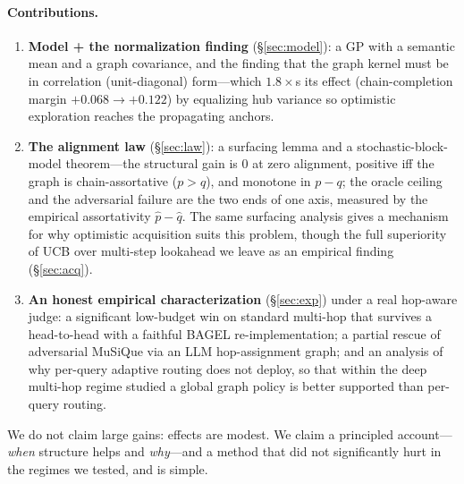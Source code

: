 \documentclass[11pt]{article}
\theoremstyle{plain}\newtheorem{theorem}{Theorem}\newtheorem{lemma}{Lemma}\newtheorem{proposition}{Proposition}
\theoremstyle{definition}\newtheorem{assumption}{Assumption}\newtheorem{remark}{Remark}
\begin{document}
\paragraph{Contributions.}
\begin{enumerate}[leftmargin=*,itemsep=1pt,topsep=2pt]
\item \textbf{Model + the normalization finding} (\S\ref{sec:model}): a GP with a semantic mean and a graph
covariance, and the finding that the graph kernel must be in correlation (unit-diagonal) form---which
$1.8\times$s its effect (chain-completion margin $+0.068\to+0.122$) by equalizing hub variance so optimistic
exploration reaches the propagating anchors.
\item \textbf{The alignment law} (\S\ref{sec:law}): a surfacing lemma and a stochastic-block-model theorem---the
structural gain is $0$ at zero alignment, positive iff the graph is chain-assortative ($p>q$), and monotone in
$p-q$; the oracle ceiling and the adversarial failure are the two ends of one axis, measured by the empirical
assortativity $\hat p-\hat q$. The same surfacing analysis gives a mechanism for why optimistic acquisition suits
this problem, though the full superiority of UCB over multi-step lookahead we leave as an empirical finding
(\S\ref{sec:acq}).
\item \textbf{An honest empirical characterization} (\S\ref{sec:exp}) under a real hop-aware judge: a significant
low-budget win on standard multi-hop that survives a head-to-head with a faithful BAGEL re-implementation; a
partial rescue of adversarial MuSiQue via an LLM hop-assignment graph; and
an analysis of why per-query adaptive routing does not deploy, so that within the deep multi-hop regime studied a
global graph policy is better supported than per-query routing.
\end{enumerate}
We do not claim large gains: effects are modest. We claim a principled account---\emph{when} structure helps and
\emph{why}---and a method that did not significantly hurt in the regimes we tested, and is simple.
\end{document}
